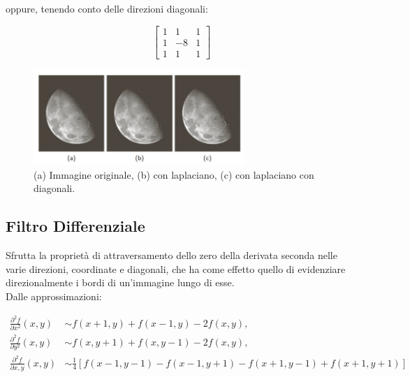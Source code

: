 oppure, tenendo conto delle direzioni diagonali:

\begin{center}
    \[
        \begin{bmatrix}
            1 & 1  & 1 \\
            1 & -8 & 1 \\
            1 & 1  & 1
        \end{bmatrix}
    \]
\end{center}

\begin{figure}[H]
    \centering
    \includegraphics[width=8cm, keepaspectratio]{capitoli/immagini/imgs/laplaciano.png}
    \caption{(a) Immagine originale, (b) con laplaciano, (c) con laplaciano con diagonali.}
\end{figure}

\subsection{Filtro Differenziale}

Sfrutta la proprietà di attraversamento dello zero della derivata seconda nelle
varie direzioni, coordinate e diagonali, che ha come effetto quello di
evidenziare direzionalmente i bordi di un'immagine lungo di esse. \\Dalle
approssimazioni:

\begin{align*}
    \frac{\partial^2{f}}{\partial{x}^2}(x,y) & \sim f(x+1,y)+f(x-1,y)-2f(x,y),                                \\
    \frac{\partial^2{f}}{\partial{y}^2}(x,y) & \sim f(x,y+1)+f(x,y-1)-2f(x,y),                                \\
    \frac{\partial^2{f}}{\partial{x,y}}(x,y) & \sim \frac{1}{4}[f(x-1,y-1)-f(x-1,y+1)-f(x+1,y-1)+f(x+1, y+1)]
\end{align*}

